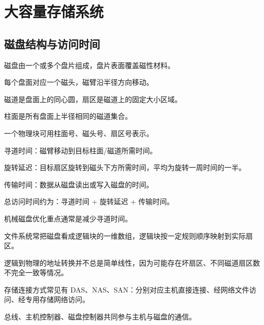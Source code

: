 
\chapter{大容量存储系统}

\section{磁盘结构与访问时间}
\begin{points}
  \item 磁盘由一个或多个盘片组成，盘片表面覆盖磁性材料。
  \item 每个盘面对应一个磁头，磁臂沿半径方向移动。
  \item 磁道是盘面上的同心圆，扇区是磁道上的固定大小区域。
  \item 柱面是所有盘面上半径相同的磁道集合。
  \item 一个物理块可用柱面号、磁头号、扇区号表示。
\end{points}


\begin{points}
  \item 寻道时间：磁臂移动到目标柱面/磁道所需时间。
  \item 旋转延迟：目标扇区旋转到磁头下方所需时间，平均为旋转一周时间的一半。
  \item 传输时间：数据从磁盘读出或写入磁盘的时间。
  \item 总访问时间约为：寻道时间 + 旋转延迟 + 传输时间。
  \item 机械磁盘优化重点通常是减少寻道时间。
\end{points}


\begin{points}
  \item 文件系统常把磁盘看成逻辑块的一维数组，逻辑块按一定规则顺序映射到实际扇区。
  \item 逻辑到物理的地址转换并不总是简单线性，因为可能存在坏扇区、不同磁道扇区数不完全一致等情况。
  \item 存储连接方式常见有 DAS、NAS、SAN：分别对应主机直接连接、经网络文件访问、经专用存储网络访问。
  \item 总线、主机控制器、磁盘控制器共同参与主机与磁盘的通信。
\end{points}


